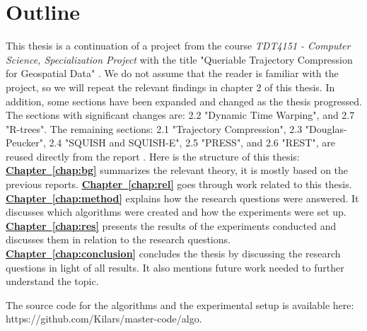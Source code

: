\section{Outline}
This thesis is a continuation of a project from the course \textit{TDT4151 - Computer Science, Specialization Project} with the title "Queriable Trajectory Compression for Geospatial Data" \cite{Project2023}. We do not assume that the reader is familiar with the project, so we will repeat the relevant findings in chapter 2 of this thesis. In addition, some sections have been expanded and changed as the thesis progressed. The sections with significant changes are: 2.2 "Dynamic Time Warping", and 2.7 "R-trees". The remaining sections: 2.1 "Trajectory Compression", 2.3 "Douglas-Peucker", 2.4 "SQUISH and SQUISH-E", 2.5 "PRESS", and 2.6 "REST", are reused directly from the report \cite{Project2023}. Here is the structure of this thesis:\newline\newline
\textbf{\hyperref[chap:bg]{Chapter~\ref*{chap:bg}}} summarizes the relevant theory, it is mostly based on the previous reports.
\newline
\textbf{\hyperref[chap:rel]{Chapter~\ref*{chap:rel}}} goes through work related to this thesis.
\newline
\textbf{\hyperref[chap:method]{Chapter~\ref*{chap:method}}} explains how the research questions were answered. It discusses which algorithms were created and how the experiments were set up.
\newline
\textbf{\hyperref[chap:res]{Chapter~\ref*{chap:res}}} presents the results of the experiments conducted and discusses them in relation to the research questions.
\newline
\textbf{\hyperref[chap:conclusion]{Chapter~\ref*{chap:conclusion}}} concludes the thesis by discussing the research questions in light of all results. It also mentions future work needed to further understand the topic.


The source code for the algorithms and the experimental setup is available here: https://github.com/Kilars/master-code/algo.

